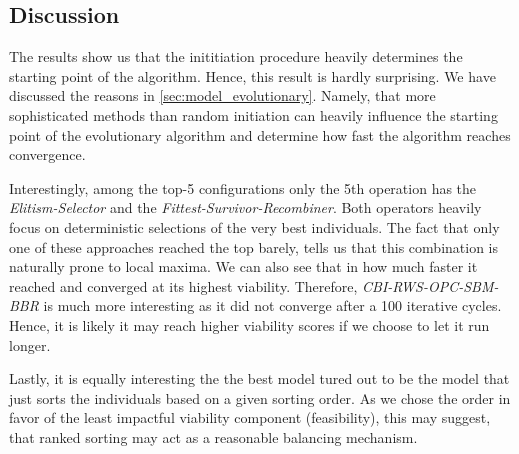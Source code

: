 \documentclass[./../../paper.tex]{subfiles}
\begin{document}
\subsection{Discussion}

The results show us that the inititiation procedure heavily determines the starting point of the algorithm. Hence, this result is hardly surprising. We have discussed the reasons in \autoref{sec:model_evolutionary}. Namely, that more sophisticated methods than random initiation can heavily influence the starting point of the evolutionary algorithm and determine how fast the algorithm reaches convergence. 

Interestingly, among the top-5 configurations only the 5th operation has the \emph{Elitism-Selector} and the \emph{Fittest-Survivor-Recombiner}. Both operators heavily focus on deterministic selections of the very best individuals. The fact that only one of these approaches reached the top barely, tells us that this combination is naturally prone to local maxima. We can also see that in how much faster it reached and converged at its highest viability. Therefore, \emph{CBI-RWS-OPC-SBM-BBR} is much more interesting as it did not converge after a 100 iterative cycles. Hence, it is likely it may reach higher viability scores if we choose to let it run longer.

Lastly, it is equally interesting the the best model tured out to be the model that just sorts the individuals based on a given sorting order. As we chose the order in favor of the least impactful viability component (feasibility), this may suggest, that ranked sorting may act as a reasonable balancing mechanism. 

\end{document}
